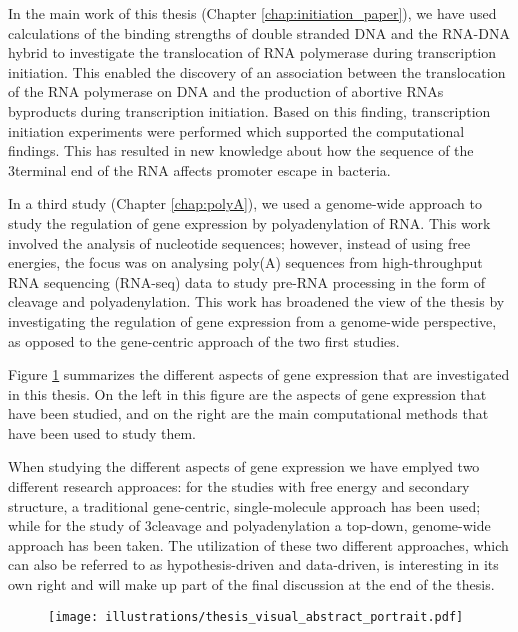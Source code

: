 In the main work of this thesis (Chapter \ref{chap:initiation_paper}), we have
used calculations of the binding strengths of double stranded DNA and the
RNA-DNA hybrid to investigate the translocation of RNA polymerase during
transcription initiation. This enabled the discovery of an association between
the translocation of the RNA polymerase on DNA and the production of abortive
RNAs byproducts during transcription initiation. Based on this finding,
transcription initiation experiments were performed which supported the
computational findings. This has resulted in new knowledge about how the
sequence of the 3\ppp terminal end of the RNA affects promoter escape in
bacteria.

In a third study (Chapter \ref{chap:polyA}), we used a genome-wide approach to
study the regulation of gene expression by polyadenylation of RNA. This work
involved the analysis of nucleotide sequences; however, instead of using free
energies, the focus was on analysing poly(A) sequences from high-throughput RNA
sequencing (RNA-seq) data to study pre-RNA processing in the form of cleavage
and polyadenylation. This work has broadened the view of the thesis by
investigating the regulation of gene expression from a genome-wide perspective,
as opposed to the gene-centric approach of the two first studies.

Figure \ref{fig:thesis_visual} summarizes the different aspects of gene
expression that are investigated in this thesis. On the left in this figure are
the aspects of gene expression that have been studied, and on the right are the
main computational methods that have been used to study them.

When studying the different aspects of gene expression we have emplyed two
different research approaces: for the studies with free energy and secondary
structure, a traditional gene-centric, single-molecule approach has been used;
while for the study of 3\ppp cleavage and polyadenylation a top-down,
genome-wide approach has been taken. The utilization of these two different
approaches, which can also be referred to as hypothesis-driven and data-driven,
is interesting in its own right and will make up part of the final discussion
at the end of the thesis.

\begin{figure}[htb]
	\begin{center}
		\texttt{[image: illustrations/thesis\_visual\_abstract\_portrait.pdf]}
	\end{center}
	\caption{}
	\label{fig:thesis_visual}
\end{figure}
